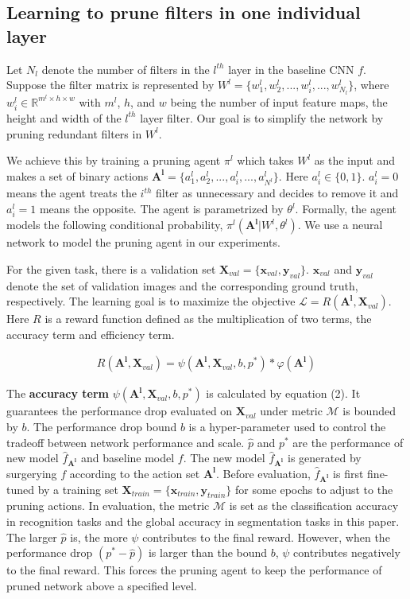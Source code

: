 \documentclass[10pt,twocolumn,letterpaper]{article}
\begin{document}
\subsection{Learning to prune filters in one individual layer}
Let $N_l$ denote the number of filters in the $l^{th}$ layer in the baseline CNN $f$. Suppose the filter matrix is represented by $W^l = \{w^l_{1}, w^l_{2}, ..., w^l_{i},..., w^l_{N_l}\}$, where $w^l_{i} \in \mathbb{R}^{m^l \times h \times w}$ with $m^l$, $h$, and $w$ being the number of input feature maps, the height and width of the $l^{th}$ layer filter. Our goal is to simplify the network by pruning redundant filters in $W^l$. 

We achieve this by training a pruning agent $\pi^l$ which takes $W^l$ as the input and makes a set of binary actions $\mathbf{A^l} = \{ a^l_1, a^l_2, ..., a^l_i, ..., a^l_{N^l}  \}$. Here $a^l_i \in \{0,1\}$. $a^l_i = 0$ means the agent treats the $i^{th}$ filter as unnecessary and decides to remove it and $a^l_i = 1$ means the opposite. The agent is parametrized by $\theta^l$. Formally, the agent models the following conditional probability, $\pi^l( \mathbf{A^l} | W^l, \theta^l  )$. We use a neural network to model the pruning agent in our experiments.

For the given task, there is a validation set $\mathbf{X}_{val} = \{  \mathbf{x}_{val}, \mathbf{y}_{val}  \}$. $\mathbf{x}_{val}$ and $\mathbf{y}_{val}$ denote the set of validation images and the corresponding ground truth, respectively. The learning goal is to maximize the objective $\mathcal{L} = R( \mathbf{A^l}, \mathbf{X}_{val} )$. Here $R$ is a reward function defined as the multiplication of two terms, the accuracy term and efficiency term.

 \begin{gather}
  R(\mathbf{A^l}, \mathbf{X}_{val}) = \psi(\mathbf{A^l}, \mathbf{X}_{val}, b, p^*) * \varphi(\mathbf{A^l})
\end{gather}


The \textbf{accuracy term} $\psi(\mathbf{A^l}, \mathbf{X}_{val}, b, p^*)$ is calculated by equation (2). It guarantees the performance drop evaluated on $\mathbf{X}_{val}$ under metric $\mathcal{M}$ is bounded by $b$. The performance drop bound $b$ is a hyper-parameter used to control the tradeoff between network performance and scale. $\hat{p}$ and $p^*$ are the performance of new model $\hat{f}_{\mathbf{A^l}}$ and baseline model $f$. The new model $\hat{f}_{\mathbf{A^l}}$ is generated by surgerying $f$ according to the action set $\mathbf{A^l}$. Before evaluation, $\hat{f}_{\mathbf{A^l}}$ is first fine-tuned by a training set $\mathbf{X}_{train} = \{  \mathbf{x}_{train}, \mathbf{y}_{train}  \}$ for some epochs to adjust to the pruning actions. In evaluation, the metric $\mathcal{M}$ is set as the classification accuracy in recognition tasks and the global accuracy in segmentation tasks in this paper. The larger $\hat{p}$ is, the more $\psi$ contributes to the final reward. However, when the performance drop $(p^* - \hat{p})$ is larger than the bound $b$, $\psi$ contributes negatively to the final reward. This forces the pruning agent to keep the performance of pruned network above a specified level.
\end{document}
